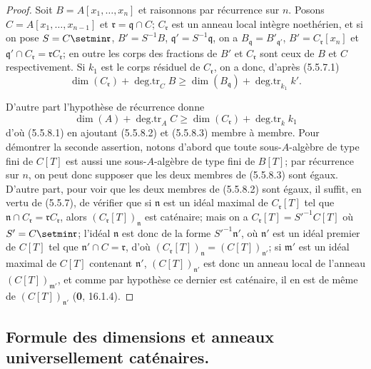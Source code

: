 \begin{proof}
Soit $B=A[x_1,\ldots,x_n]$ et raisonnons par récurrence sur $n$. Posons
$C=A[x_1,\ldots,x_{n-1}]$ et $\mathfrak r=\mathfrak q\cap C$;
$C_{\mathfrak r}$ est un anneau local intègre noethérien, et si on pose
$S=C\setmin\mathfrak r$, $B'=S^{-1}B$, $\mathfrak q'=S^{-1}\mathfrak q$, on a
$B_{\mathfrak q}=B'_{\mathfrak q'}$, $B'=C_{\mathfrak r}[x_n]$ et
$\mathfrak q'\cap C_{\mathfrak r}=\mathfrak rC_{\mathfrak r}$; en outre les
corps des fractions
de $B'$ et $C_{\mathfrak r}$ sont ceux de $B$ et $C$
respectivement. Si $k_1$ est le corps résiduel de $C_{\mathfrak r}$, on a
donc, d'après (5.5.7.1)
\begin{equation}
\dim(C_{\mathfrak r})+\operatorname{deg.tr}_C B
\geq\dim(B_{\mathfrak q})+\operatorname{deg.tr}_{k_1}k'.
\tag{5.5.8.2}\label{IV.2.s5.5.8.2-fr}
\end{equation}

D'autre part l'hypothèse de récurrence donne
\begin{equation}
\dim(A)+\operatorname{deg.tr}_A C
\geq\dim(C_{\mathfrak r})+\operatorname{deg.tr}_k k_1
\tag{5.5.8.3}\label{IV.2.s5.5.8.3-fr}
\end{equation}
d'où (5.5.8.1) en ajoutant (5.5.8.2) et (5.5.8.3) membre à membre. Pour
démontrer la seconde assertion, notons d'abord que toute sous-$A$-algèbre de
type fini de $C[T]$ est aussi une sous-$A$-algèbre de type fini de $B[T]$;
par récurrence sur $n$, on peut donc supposer que les deux membres de
(5.5.8.3) sont égaux. D'autre part, pour voir que les deux membres de
(5.5.8.2) sont égaux, il suffit, en vertu de (5.5.7), de vérifier que si
$\mathfrak n$ est un idéal maximal de $C_{\mathfrak r}[T]$ tel que
$\mathfrak n\cap C_{\mathfrak r}=\mathfrak rC_{\mathfrak r}$, alors
$(C_{\mathfrak r}[T])_{\mathfrak n}$ est caténaire; mais on a
$C_{\mathfrak r}[T]=S'^{-1}C[T]$ où $S'=C\setmin\mathfrak r$; l'idéal
$\mathfrak n$ est donc de la forme $S'^{-1}\mathfrak n'$, où $\mathfrak n'$
est un idéal premier de $C[T]$ tel que $\mathfrak n'\cap C=\mathfrak r$,
d'où $(C_{\mathfrak r}[T])_{\mathfrak n}=(C[T])_{\mathfrak n'}$; si
$\mathfrak m'$ est un idéal maximal de $C[T]$ contenant $\mathfrak n'$,
$(C[T])_{\mathfrak n'}$ est donc un anneau local de l'anneau
$(C[T])_{\mathfrak m'}$, et comme par hypothèse ce dernier est caténaire, il
en est de même de $(C[T])_{\mathfrak n'}$ (\textbf{0}, 16.1.4).
\end{proof}

\subsection{Formule des dimensions et anneaux universellement caténaires.}
\label{IV.2.s5.6-fr}

